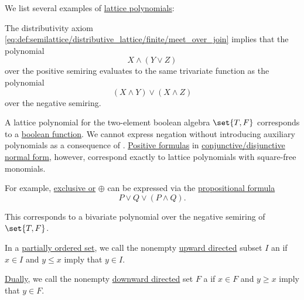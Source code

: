 \begin{example}\label{ex:lattice_polynomials}
  We list several examples of \hyperref[rem:lattice_polynomials]{lattice polynomials}:
  \begin{thmenum}
     The distributivity axiom \eqref{eq:def:semilattice/distributive_lattice/finite/meet_over_join} implies that the polynomial
    \begin{equation*}
      X \wedge (Y \vee Z)
    \end{equation*}
    over the positive semiring evaluates to the same trivariate function as the polynomial
    \begin{equation*}
      (X \wedge Y) \vee (X \wedge Z)
    \end{equation*}
    over the negative semiring.

     A lattice polynomial for the two-element boolean algebra \hyperref[def:boolean_value]{\( \set{ T, F } \)} corresponds to a \hyperref[def:boolean_function]{boolean function}. We cannot express negation without introducing auxiliary polynomials as a consequence of . \hyperref[def:positive_formula]{Positive formulas} in \hyperref[def:cnf_and_dnf]{conjunctive/disjunctive normal form}, however, correspond exactly to lattice polynomials with square-free monomials.

    For example, \hyperref[def:standard_boolean_operators]{exclusive or} \( \oplus \) can be expressed via the \hyperref[def:propositional_syntax/formula]{propositional formula}
    \begin{equation*}
      P \vee Q \vee (P \wedge Q).
    \end{equation*}

    This corresponds to a bivariate polynomial over the negative semiring of \( \set{ T, F } \).
  \end{thmenum}
\end{example}

\begin{definition}\label{def:order_ideal_and_filter}
  In a \hyperref[def:partially_ordered_set]{partially ordered set}, we call the nonempty \hyperref[def:directed_set]{upward directed} subset \( I \) an  if \( x \in I \) and \( y \leq x \) imply that \( y \in I \).

  \hyperref[def:partially_ordered_set/duality]{Dually}, we call the nonempty \hyperref[def:directed_set]{downward directed} set \( F \) a  if \( x \in F \) and \( y \geq x \) imply that \( y \in F \).
\end{definition}

